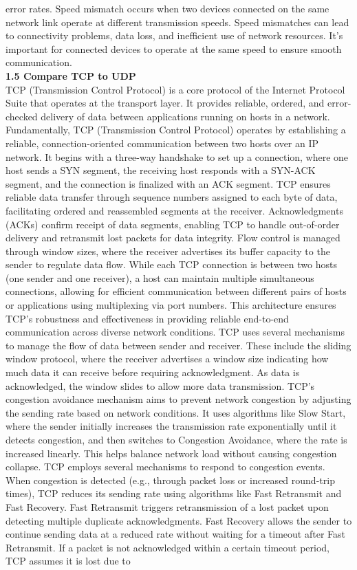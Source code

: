 \documentclass{article}
\begin{document}
error rates. Speed mismatch occurs when two devices connected on the same network link operate at different transmission speeds. Speed mismatches can lead to connectivity problems, data loss, and inefficient use of network resources. It's important for connected devices to operate at the same speed to ensure smooth communication.\\
  	
\textbf{1.5 Compare TCP to UDP}\\

TCP (Transmission Control Protocol) is a core protocol of the Internet Protocol Suite that operates at the transport layer. It provides reliable, ordered, and error-checked delivery of data between applications running on hosts in a network. Fundamentally, TCP (Transmission Control Protocol) operates by establishing a reliable, connection-oriented communication between two hosts over an IP network. It begins with a three-way handshake to set up a connection, where one host sends a SYN segment, the receiving host responds with a SYN-ACK segment, and the connection is finalized with an ACK segment. TCP ensures reliable data transfer through sequence numbers assigned to each byte of data, facilitating ordered and reassembled segments at the receiver. Acknowledgments (ACKs) confirm receipt of data segments, enabling TCP to handle out-of-order delivery and retransmit lost packets for data integrity. Flow control is managed through window sizes, where the receiver advertises its buffer capacity to the sender to regulate data flow. While each TCP connection is between two hosts (one sender and one receiver), a host can maintain multiple simultaneous connections, allowing for efficient communication between different pairs of hosts or applications using multiplexing via port numbers. This architecture ensures TCP's robustness and effectiveness in providing reliable end-to-end communication across diverse network conditions. TCP uses several mechanisms to manage the flow of data between sender and receiver. These include the sliding window protocol, where the receiver advertises a window size indicating how much data it can receive before requiring acknowledgment. As data is acknowledged, the window slides to allow more data transmission. TCP's congestion avoidance mechanism aims to prevent network congestion by adjusting the sending rate based on network conditions. It uses algorithms like Slow Start, where the sender initially increases the transmission rate exponentially until it detects congestion, and then switches to Congestion Avoidance, where the rate is increased linearly. This helps balance network load without causing congestion collapse. TCP employs several mechanisms to respond to congestion events. When congestion is detected (e.g., through packet loss or increased round-trip times), TCP reduces its sending rate using algorithms like Fast Retransmit and Fast Recovery. Fast Retransmit triggers retransmission of a lost packet upon detecting multiple duplicate acknowledgments. Fast Recovery allows the sender to continue sending data at a reduced rate without waiting for a timeout after Fast Retransmit. If a packet is not acknowledged within a certain timeout period, TCP assumes it is lost due to 
\end{document}
